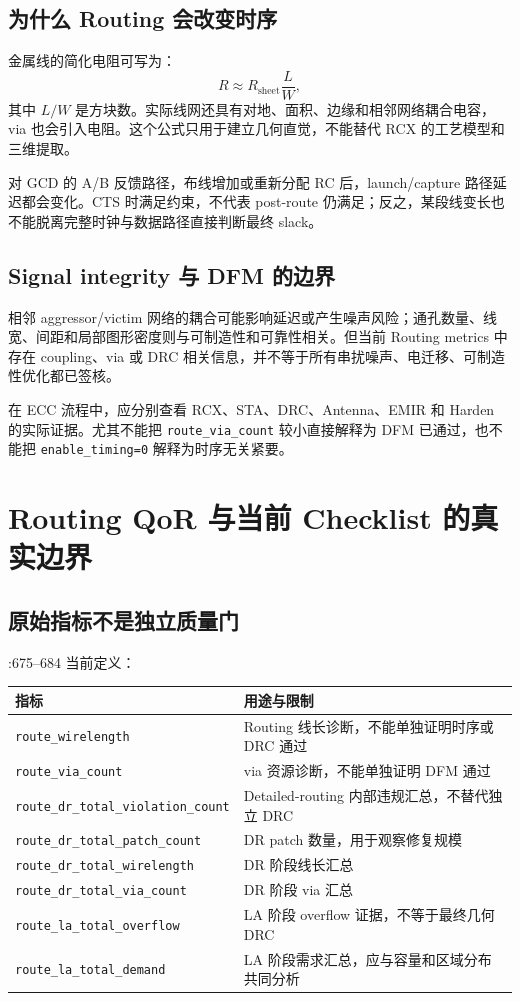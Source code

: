\documentclass[UTF8,a4paper,11pt,fontset=fandol]{ctexart}
\newcommand{\code}[1]{\nolinkurl{#1}}
\begin{document}
\subsection{为什么 Routing 会改变时序}

金属线的简化电阻可写为：
\[
  R\approx R_{\mathrm{sheet}}\frac{L}{W},
\]
其中 $L/W$ 是方块数。实际线网还具有对地、面积、边缘和相邻网络耦合电容，via 也会引入电阻。这个公式只用于建立几何直觉，不能替代 RCX 的工艺模型和三维提取。

对 GCD 的 A/B 反馈路径，布线增加或重新分配 RC 后，launch/capture 路径延迟都会变化。CTS 时满足约束，不代表 post-route 仍满足；反之，某段线变长也不能脱离完整时钟与数据路径直接判断最终 slack。

\subsection{Signal integrity 与 DFM 的边界}

相邻 aggressor/victim 网络的耦合可能影响延迟或产生噪声风险；通孔数量、线宽、间距和局部图形密度则与可制造性和可靠性相关。但当前 Routing metrics 中存在 coupling、via 或 DRC 相关信息，并不等于所有串扰噪声、电迁移、可制造性优化都已签核。

在 ECC 流程中，应分别查看 RCX、STA、DRC、Antenna、EMIR 和 Harden 的实际证据。尤其不能把 \code{route_via_count} 较小直接解释为 DFM 已通过，也不能把 \code{enable_timing=0} 解释为时序无关紧要。

\section{Routing QoR 与当前 Checklist 的真实边界}

\subsection{原始指标不是独立质量门}

:675--684 当前定义：
\begin{center}
\begin{tabularx}{\textwidth}{p{}X}
\toprule
指标 & 用途与限制 \\
\midrule
\code{route_wirelength} & Routing 线长诊断，不能单独证明时序或 DRC 通过 \\
\code{route_via_count} & via 资源诊断，不能单独证明 DFM 通过 \\
\code{route_dr_total_violation_count} & Detailed-routing 内部违规汇总，不替代独立 DRC \\
\code{route_dr_total_patch_count} & DR patch 数量，用于观察修复规模 \\
\code{route_dr_total_wirelength} & DR 阶段线长汇总 \\
\code{route_dr_total_via_count} & DR 阶段 via 汇总 \\
\code{route_la_total_overflow} & LA 阶段 overflow 证据，不等于最终几何 DRC \\
\code{route_la_total_demand} & LA 阶段需求汇总，应与容量和区域分布共同分析 \\
\bottomrule
\end{tabularx}
\end{center}
\end{document}
